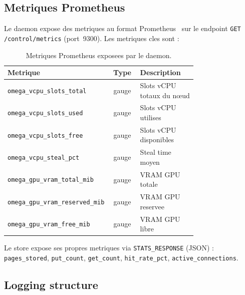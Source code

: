 \subsection{Metriques Prometheus}
\label{subsec:metriques-prometheus}

Le daemon expose des metriques au format Prometheus~\cite{prometheus_doc} sur le endpoint \texttt{GET /control/metrics} (port~9300). Les metriques cles sont :

\begin{table}[htbp]
    \centering
    \caption{Metriques Prometheus exposees par le daemon.}
    \label{tab:metriques-prometheus}
    \begin{tabular}{p{0.45\linewidth} c p{0.30\linewidth}}
        \toprule
        \textbf{Metrique} & \textbf{Type} & \textbf{Description} \\
        \midrule
        \texttt{omega\_vcpu\_slots\_total} & gauge & Slots vCPU totaux du n\oe{}ud \\
        \texttt{omega\_vcpu\_slots\_used} & gauge & Slots vCPU utilises \\
        \texttt{omega\_vcpu\_slots\_free} & gauge & Slots vCPU disponibles \\
        \texttt{omega\_vcpu\_steal\_pct} & gauge & Steal time moyen \\
        \texttt{omega\_gpu\_vram\_total\_mib} & gauge & VRAM GPU totale \\
        \texttt{omega\_gpu\_vram\_reserved\_mib} & gauge & VRAM GPU reservee \\
        \texttt{omega\_gpu\_vram\_free\_mib} & gauge & VRAM GPU libre \\
        \bottomrule
    \end{tabular}
\end{table}

Le store expose ses propres metriques via \texttt{STATS\_RESPONSE} (JSON) : \texttt{pages\_stored}, \texttt{put\_count}, \texttt{get\_count}, \texttt{hit\_rate\_pct}, \texttt{active\_connections}.

\subsection{Logging structure}
\label{subsec:logging-structure}

